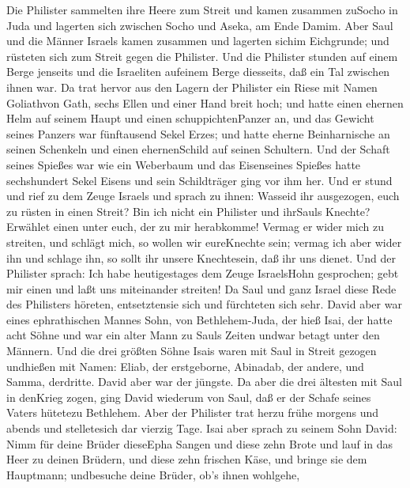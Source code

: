  Die Philister sammelten ihre Heere zum Streit und kamen
zusammen zuSocho in Juda und lagerten sich zwischen Socho und Aseka, am
Ende Damim.  Aber Saul und die Männer Israels kamen zusammen
und lagerten sichim Eichgrunde; und rüsteten sich zum Streit gegen die
Philister.  Und die Philister stunden auf einem Berge
jenseits und die Israeliten aufeinem Berge diesseits, daß ein Tal
zwischen ihnen war.  Da trat hervor aus den Lagern der
Philister ein Riese mit Namen Goliathvon Gath, sechs Ellen und einer
Hand breit hoch;  und hatte einen ehernen Helm auf seinem
Haupt und einen schuppichtenPanzer an, und das Gewicht seines Panzers
war fünftausend Sekel Erzes;  und hatte eherne Beinharnische
an seinen Schenkeln und einen ehernenSchild auf seinen Schultern.
 Und der Schaft seines Spießes war wie ein Weberbaum und das
Eisenseines Spießes hatte sechshundert Sekel Eisens und sein
Schildträger ging vor ihm her.  Und er stund und rief zu dem
Zeuge Israels und sprach zu ihnen: Wasseid ihr ausgezogen, euch zu
rüsten in einen Streit? Bin ich nicht ein Philister und ihrSauls
Knechte? Erwählet einen unter euch, der zu mir herabkomme! 
Vermag er wider mich zu streiten, und schlägt mich, so wollen wir
eureKnechte sein; vermag ich aber wider ihn und schlage ihn, so sollt
ihr unsere Knechtesein, daß ihr uns dienet.  Und der
Philister sprach: Ich habe heutigestages dem Zeuge IsraelsHohn
gesprochen; gebt mir einen und laßt uns miteinander streiten!
 Da Saul und ganz Israel diese Rede des Philisters höreten,
entsetztensie sich und fürchteten sich sehr.  David aber
war eines ephrathischen Mannes Sohn, von Bethlehem-Juda, der hieß Isai,
der hatte acht Söhne und war ein alter Mann zu Sauls Zeiten undwar
betagt unter den Männern.  Und die drei größten Söhne Isais
waren mit Saul in Streit gezogen undhießen mit Namen: Eliab, der
erstgeborne, Abinadab, der andere, und Samma, derdritte. 
David aber war der jüngste. Da aber die drei ältesten mit Saul in
denKrieg zogen,  ging David wiederum von Saul, daß er der
Schafe seines Vaters hütetezu Bethlehem.  Aber der
Philister trat herzu frühe morgens und abends und stelletesich dar
vierzig Tage.  Isai aber sprach zu seinem Sohn David: Nimm
für deine Brüder dieseEpha Sangen und diese zehn Brote und lauf in das
Heer zu deinen Brüdern,  und diese zehn frischen Käse, und
bringe sie dem Hauptmann; undbesuche deine Brüder, ob's ihnen wohlgehe,
